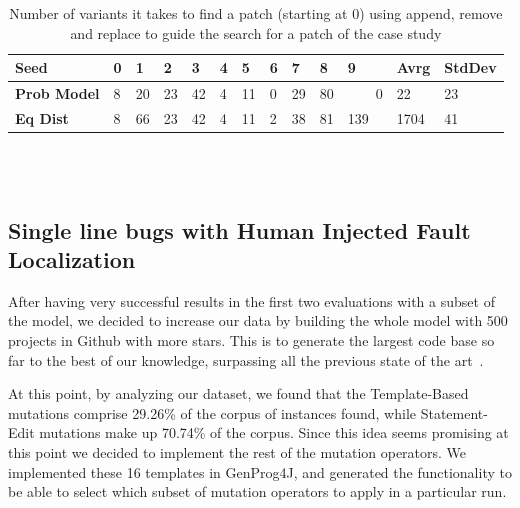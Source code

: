 \documentclass[conference]{IEEEtran}
\begin{document}
\begin{table}[ht]
\begin{tabular}{lR{0.1cm}R{0.1cm}R{0.1cm}R{0.1cm}R{0.1cm}R{0.1cm}R{0.1cm}R{0.1cm}R{0.1cm}R{0.1cm}R{0.5cm}R{0.5cm}}
\hline
\textbf{Seed} & \textbf{0} & \textbf{1} & \textbf{2} & \textbf{3} & \textbf{4} & \textbf{5} & \textbf{6} & \textbf{7} & \textbf{8} & \textbf{9}  & Avrg & StdDev  \\
\hline
\textbf{Prob Model} & 8 & 20 & 23 & 42 & 4 & 11 & 0 & 29 & 80 & ~~~~0 & 22 & 23\\

\textbf{Eq Dist} & 8 & 66 & 23 & 42 & 4 & 11 & 2 & 38 & 81 & 139 & 1704 & 41 \\
\hline
\end{tabular}
\\
\\
  \caption{Number of variants it takes to find a patch (starting at 0) using append, remove and replace to guide the search for a patch of 
the case study}
  \label{fig:resultsARR}
\end{table} 

\subsection{Single line bugs with Human Injected Fault Localization}
\label{sec:single}

After having very successful results in the first two evaluations with a subset of the model, we decided 
to increase our data by building the whole model with 500 projects in Github with more 
stars. This is to generate the largest code base so far to the best 
of our knowledge, surpassing all the previous state of the 
art~\cite{long15,Soto15,zhong15,matias15,xuan16}. 

At this point, by analyzing our dataset, 
we found that the Template-Based mutations comprise 29.26\% of the corpus of 
instances found, while Statement-Edit mutations make up 70.74\% of the 
corpus. Since this idea seems promising at this point we decided to implement the rest 
of the mutation operators. We implemented these 16 templates in GenProg4J, and generated the functionality 
to be able to select which subset of mutation operators to apply in a particular 
run.
\end{document}
